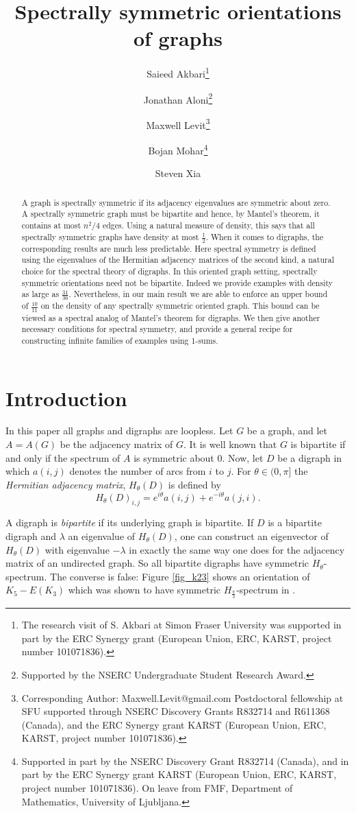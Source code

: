 \documentclass[11pt]{article}
\title{Spectrally symmetric orientations of graphs}
\author[1]{Saieed Akbari\thanks{The research visit of S. Akbari at Simon Fraser University was supported in part by the ERC Synergy grant (European Union, ERC, KARST, project number 101071836).}}
\author[2]{Jonathan Aloni\thanks{Supported by the NSERC Undergraduate Student Research Award.}}
\author[3]{Maxwell Levit\thanks{Corresponding Author: Maxwell.Levit@gmail.com Postdoctoral fellowship at SFU supported through NSERC Discovery Grants R832714 and R611368 (Canada), and the ERC Synergy grant KARST (European Union, ERC, KARST, project number 101071836).} }
\author[2]{Bojan Mohar\thanks{Supported in part by the NSERC Discovery Grant R832714 (Canada), and in part by the ERC Synergy grant KARST (European Union, ERC, KARST, project number 101071836).
On leave from FMF, Department of Mathematics, University of Ljubljana.}}
\author[2]{Steven Xia}
\affil[1]{Sharif University of Technology}
\affil[2]{Simon Fraser University}
\affil[3]{York University}
\date{}
\theoremstyle{plain}
\begin{document}
\maketitle
\begin{abstract}
A graph is spectrally symmetric if its adjacency eigenvalues are symmetric about zero. A spectrally symmetric graph must be bipartite and hence, by Mantel's theorem, it contains at most $n^2/4$ edges. Using a natural measure of density, this says that all spectrally symmetric graphs have density at most $\tfrac{1}{2}$. When it comes to digraphs, the corresponding results are much less predictable. 
Here spectral symmetry is defined using the eigenvalues of the Hermitian adjacency matrices of the second kind, a natural choice for the spectral theory of digraphs. In this oriented graph setting, spectrally symmetric orientations need not be bipartite. Indeed we provide examples with density as large as $\tfrac{31}{36}$. Nevertheless, in our main result we are able to enforce an upper bound of $\tfrac{10}{11}$ on the density of any spectrally symmetric oriented graph. This bound can be viewed as a spectral analog of Mantel's theorem for digraphs. We then give another necessary conditions for spectral symmetry, and provide a general recipe for constructing infinite families of examples using 1-sums.
\end{abstract}


\section{Introduction}

In this paper all graphs and digraphs are loopless. Let $G$ be a graph, and let $A=A(G)$ be the adjacency matrix of $G$. It is well known that $G$ is bipartite if and only if the spectrum of $A$ is symmetric about 0. 
Now, let $D$ be a digraph in which $a(i,j)$ denotes the number of arcs from $i$ to $j$. For $\theta\in (0,\pi]$ the \emph{Hermitian adjacency matrix}, $H_\theta(D)$ is defined by \[H_\theta(D)_{i,j}=e^{i\theta} a(i,j)+e^{-i\theta} a(j,i).\]

A digraph is \emph{bipartite} if its underlying graph is bipartite. If $D$ is a bipartite digraph and $\lambda$ an eigenvalue of $H_\theta(D)$, one can construct an eigenvector of $H_\theta(D)$ with eigenvalue $-\lambda$ in exactly the same way one does for the adjacency matrix of an undirected graph. So all bipartite digraphs have symmetric $H_\theta$-spectrum.  The converse is false: Figure \ref{fig_k23} shows an orientation of $K_5-E(K_3)$ which was shown to have symmetric $H_{\frac{\pi}{3}}$-spectrum in \cite{M20}. 
\end{document}
